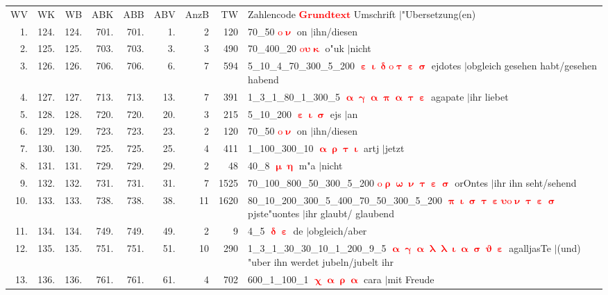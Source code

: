 \documentclass[a4paper,10pt,landscape]{article}
\begin{document}
\begin{tabular}{rrrrrrrrp{120mm}}
WV&WK&WB&ABK&ABB&ABV&AnzB&TW&Zahlencode \textcolor{red}{$\boldsymbol{Grundtext}$} Umschrift $|$"Ubersetzung(en)\\
1.&124.&124.&701.&701.&1.&2&120&70\_50 \textcolor{red}{$\boldsymbol{\mathrm{o}\upnu}$} on $|$ihn/diesen\\
2.&125.&125.&703.&703.&3.&3&490&70\_400\_20 \textcolor{red}{$\boldsymbol{\mathrm{o}\upsilon\upkappa}$} o"uk $|$nicht\\
3.&126.&126.&706.&706.&6.&7&594&5\_10\_4\_70\_300\_5\_200 \textcolor{red}{$\boldsymbol{\upepsilon\upiota\updelta\mathrm{o}\uptau\upepsilon\upsigma}$} ejdotes $|$obgleich gesehen habt/gesehen habend\\
4.&127.&127.&713.&713.&13.&7&391&1\_3\_1\_80\_1\_300\_5 \textcolor{red}{$\boldsymbol{\upalpha\upgamma\upalpha\uppi\upalpha\uptau\upepsilon}$} agapate $|$ihr liebet\\
5.&128.&128.&720.&720.&20.&3&215&5\_10\_200 \textcolor{red}{$\boldsymbol{\upepsilon\upiota\upsigma}$} ejs $|$an\\
6.&129.&129.&723.&723.&23.&2&120&70\_50 \textcolor{red}{$\boldsymbol{\mathrm{o}\upnu}$} on $|$ihn/diesen\\
7.&130.&130.&725.&725.&25.&4&411&1\_100\_300\_10 \textcolor{red}{$\boldsymbol{\upalpha\uprho\uptau\upiota}$} artj $|$jetzt\\
8.&131.&131.&729.&729.&29.&2&48&40\_8 \textcolor{red}{$\boldsymbol{\upmu\upeta}$} m"a $|$nicht\\
9.&132.&132.&731.&731.&31.&7&1525&70\_100\_800\_50\_300\_5\_200 \textcolor{red}{$\boldsymbol{\mathrm{o}\uprho\upomega\upnu\uptau\upepsilon\upsigma}$} orOntes $|$ihr ihn seht/sehend\\
10.&133.&133.&738.&738.&38.&11&1620&80\_10\_200\_300\_5\_400\_70\_50\_300\_5\_200 \textcolor{red}{$\boldsymbol{\uppi\upiota\upsigma\uptau\upepsilon\upsilon\mathrm{o}\upnu\uptau\upepsilon\upsigma}$} pjste"uontes $|$ihr glaubt/ glaubend\\
11.&134.&134.&749.&749.&49.&2&9&4\_5 \textcolor{red}{$\boldsymbol{\updelta\upepsilon}$} de $|$obgleich/aber\\
12.&135.&135.&751.&751.&51.&10&290&1\_3\_1\_30\_30\_10\_1\_200\_9\_5 \textcolor{red}{$\boldsymbol{\upalpha\upgamma\upalpha\uplambda\uplambda\upiota\upalpha\upsigma\upvartheta\upepsilon}$} agalljasTe $|$(und) "uber ihn werdet jubeln/jubelt ihr\\
13.&136.&136.&761.&761.&61.&4&702&600\_1\_100\_1 \textcolor{red}{$\boldsymbol{\upchi\upalpha\uprho\upalpha}$} cara $|$mit Freude\\

\end{tabular}
\end{document}

